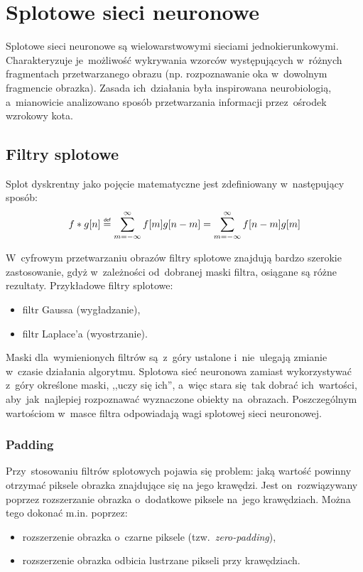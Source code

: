 \chapter{Splotowe sieci neuronowe}
Splotowe sieci neuronowe są wielowarstwowymi sieciami jednokierunkowymi. Charakteryzuje je~możliwość
wykrywania wzorców występujących w~różnych fragmentach przetwarzanego obrazu (np. rozpoznawanie oka
w~dowolnym fragmencie obrazka). Zasada ich~działania była inspirowana neurobiologią, a~mianowicie analizowano
sposób przetwarzania informacji przez~ośrodek wzrokowy kota.

\section{Filtry splotowe}
Splot dyskrentny jako pojęcie matematyczne jest zdefiniowany w~następujący sposób:
$$ f\ast g[n]\defeq \sum\limits_{m=-\infty}^{\infty}f[m]g[n-m] = \sum\limits_{m=-\infty}^{\infty}f[n-m]g[m]$$

W~cyfrowym przetwarzaniu obrazów filtry splotowe znajdują bardzo szerokie zastosowanie, gdyż w~zależności
od~dobranej maski filtra, osiągane są różne rezultaty. Przykładowe filtry splotowe:
\begin{itemize}
  \item filtr Gaussa (wygładzanie),
  \item filtr Laplace'a (wyostrzanie).
\end{itemize}
Maski dla~wymienionych filtrów są~z~góry ustalone i~nie~ulegają zmianie w~czasie działania algorytmu. Splotowa
sieć neuronowa zamiast wykorzystywać z~góry określone maski, ,,uczy się ich'', a~więc stara się~tak dobrać
ich~wartości, aby~jak~najlepiej rozpoznawać wyznaczone obiekty na~obrazach. Poszczególnym wartościom
w~masce filtra odpowiadają wagi splotowej sieci neuronowej. 

\subsection{Padding}
Przy~stosowaniu filtrów splotowych pojawia się problem: jaką wartość powinny otrzymać piksele obrazka
znajdujące się na jego krawędzi. Jest on~rozwiązywany poprzez rozszerzanie obrazka o~dodatkowe piksele
na~jego krawędziach. Można tego dokonać m.in. poprzez:
\begin{itemize}
  \item rozszerzenie obrazka o~czarne piksele (tzw.~\textit{zero-padding}),
  \item rozszerzenie obrazka odbicia lustrzane pikseli przy krawędziach.
\end{itemize}

